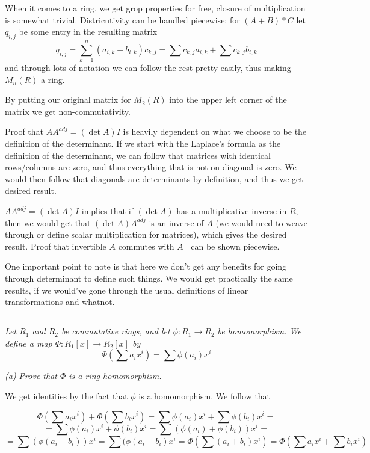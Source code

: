 \documentclass[11pt,oneside,titlepage]{book}
\DeclareMathOperator \inv {^{-1}}
\begin{document}
When it comes to a ring, we get grop properties for free, closure of
multiplication is somewhat trivial. Districutivity can be handled piecewise:
for $(A + B) * C$ let $q_{i, j}$ be some entry in the resulting matrix 
$$q_{i, j} = \sum_{k = 1}^{n}{(a_{i, k} + b_{i, k}) c_{k, j} } =
\sum{c_{k, j}a_{i, k}} + \sum{c_{k, j}b_{i, k}}$$
and through lots of notation we can follow the rest pretty easily,
thus making $M_n(R)$ a ring.

By putting our original matrix for $M_2(R)$ into the upper left corner
of the matrix we get non-commutativity.

Proof that $A A^{adj} = (\det A) I$ is heavily dependent on what we
choose to be the definition of the determinant. If we start with the
Laplace's formula as the definition of the determinant, we can follow
that matrices with identical rows/columns are zero, and thus
everything that is not on diagonal is zero. We would then follow that
diagonals are determinants by definition, and thus we get desired result.

$A A^{adj} = (\det A) I$ implies that if $(\det A)$ has a
multiplicative inverse in $R$, then we would get that $(\det
A)A^{adj}$ is an inverse of $A$ (we would need to weave through or
define scalar multiplication for matrices), which gives the desired
result. Proof that invertible $A$ commutes with $A\inv$ can be shown
piecewise.

One important point to note is that here we don't get any benefits for
going through determinant to define such things. We would get
practically the same results, if we would've gone through the usual
definitions of linear transformations and whatnot.

\subsection{}

\textit{Let $R_1$ and $R_2$ be commutative rings, and let $\phi: R_1
  \to R_2$ be homomorphism. We define a map $\Phi: R_1[x] \to R_2[x]$ by
  $$\Phi(\sum{a_i x^i}) = \sum {\phi(a_i) x^i}$$
}

\textit{(a) Prove that $\Phi$ is a ring homomorphism.}

We get identities by the fact that $\phi$ is a homomorphism. We follow that

$$\Phi(\sum{a_i x^i}) + \Phi(\sum{b_i x^i}) = \sum{\phi(a_i) x^i} + \sum{\phi(b_i) x^i} = $$
$$ =  \sum{\phi(a_i) x^i + \phi(b_i) x^i}= \sum{(\phi(a_i) + \phi(b_i)) x^i} = $$
$$ =  \sum{(\phi(a_i + b_i)) x^i}= \sum{(\phi(a_i + b_i) x^i}= \Phi(\sum{(a_i + b_i) x^i}) =
\Phi(\sum{a_i x^i} + \sum{b_i x^i} )$$
\end{document}
